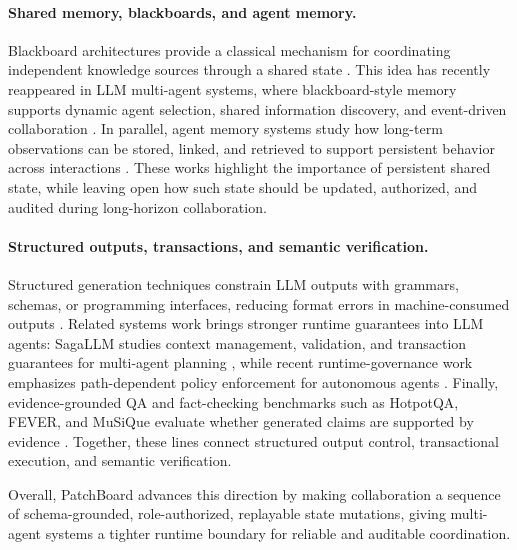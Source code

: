 \documentclass[11pt]{article}
\newcommand{\method}{PatchBoard}
\begin{document}
\paragraph{Shared memory, blackboards, and agent memory.}
Blackboard architectures provide a classical mechanism for coordinating independent knowledge sources through a shared state \citep{hayesroth1985blackboard,penny1986blackboard}. This idea has recently reappeared in LLM multi-agent systems, where blackboard-style memory supports dynamic agent selection, shared information discovery, and event-driven collaboration \citep{han2025blackboard,salemi2025blackboard}. In parallel, agent memory systems study how long-term observations can be stored, linked, and retrieved to support persistent behavior across interactions \citep{packer2023memgpt,xu2025amem}. These works highlight the importance of persistent shared state, while leaving open how such state should be updated, authorized, and audited during long-horizon collaboration.

\paragraph{Structured outputs, transactions, and semantic verification.}
Structured generation techniques constrain LLM outputs with grammars, schemas, or programming interfaces, reducing format errors in machine-consumed outputs \citep{beurer2023prompting,willard2023outlines,zheng2024sglang,geng2025jsonschemabench}. Related systems work brings stronger runtime guarantees into LLM agents: SagaLLM studies context management, validation, and transaction guarantees for multi-agent planning \citep{chang2025sagallm}, while recent runtime-governance work emphasizes path-dependent policy enforcement for autonomous agents \citep{kaptein2026runtime}. Finally, evidence-grounded QA and fact-checking benchmarks such as HotpotQA, FEVER, and MuSiQue evaluate whether generated claims are supported by evidence \citep{yang2018hotpotqa,thorne2018fever,trivedi2022musique}. Together, these lines connect structured output control, transactional execution, and semantic verification.

Overall, \method{} advances this direction by making collaboration a sequence of schema-grounded, role-authorized, replayable state mutations, giving multi-agent systems a tighter runtime boundary for reliable and auditable coordination.


\end{document}
